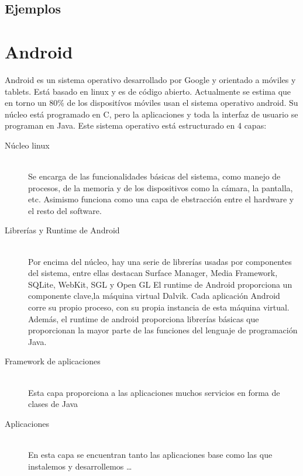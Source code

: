 \documentclass[a4paper,openright, 12pt]{book}
\begin{document}
\subsection*{Ejemplos}









\newpage
\section{Android}

Android es un sistema operativo desarrollado por Google y orientado a móviles y tablets. Está basado en linux y es de código abierto. Actualmente se estima que en torno un 80\% de los dispositívos móviles usan el sistema operativo android.
Su núcleo está programado en C, pero la aplicaciones y toda la interfaz de usuario se programan en Java.
Este sistema operativo está estructurado en 4 capas:
\begin{description}
  \item[Núcleo linux] \hfill \\
  Se encarga de las funcionalidades básicas del sistema, como manejo de procesos, de la memoria y de los dispositivos como la cámara, la pantalla, etc.
   Asimismo funciona como una capa de ebstracción entre el hardware y el resto del software.
   
  \item[Librerías y Runtime de Android] \hfill \\
  Por encima del núcleo, hay una serie de librerías usadas por componentes del sistema, entre ellas destacan Surface Manager, Media Framework, SQLite, WebKit, SGL y Open GL
  \newline
  El runtime de Android proporciona un componente clave,la máquina virtual Dalvik. Cada aplicación Android corre su propio proceso, con su propia instancia de esta máquina virtual.
  Además, el runtime de android proporciona librerías básicas que proporcionan la mayor parte de las funciones del lenguaje de programación Java.
  
  \item[Framework de aplicaciones] \hfill \\
  Esta capa proporciona a las aplicaciones muchos servicios en forma de clases de Java 
  
   \item[Aplicaciones] \hfill \\
  En esta capa se encuentran tanto las aplicaciones base como las que instalemos y desarrollemos   \ldots
\end{description}
\end{document}
